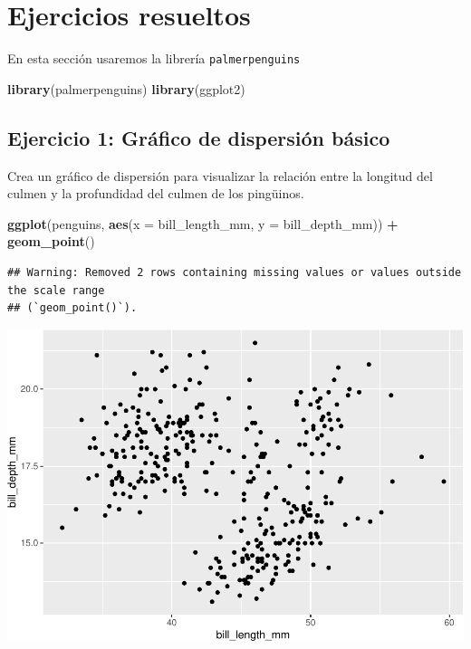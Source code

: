 \documentclass[
]{book}
\newenvironment{Shaded}{\begin{snugshade}}{\end{snugshade}}
\newcommand{\AttributeTok}[1]{\textcolor[rgb]{0.13,0.29,0.53}{#1}}
\newcommand{\FunctionTok}[1]{\textcolor[rgb]{0.13,0.29,0.53}{\textbf{#1}}}
\newcommand{\NormalTok}[1]{#1}
\newcommand{\SpecialCharTok}[1]{\textcolor[rgb]{0.81,0.36,0.00}{\textbf{#1}}}
\begin{document}
\hypertarget{ejercicios-resueltos}{%
\section{Ejercicios resueltos}\label{ejercicios-resueltos}}

En esta sección usaremos la librería \texttt{palmerpenguins}

\begin{Shaded}
\begin{Highlighting}[]
\FunctionTok{library}\NormalTok{(palmerpenguins)}
\FunctionTok{library}\NormalTok{(ggplot2)}
\end{Highlighting}
\end{Shaded}

\hypertarget{ejercicio-1-gruxe1fico-de-dispersiuxf3n-buxe1sico}{%
\subsection{Ejercicio 1: Gráfico de dispersión básico}\label{ejercicio-1-gruxe1fico-de-dispersiuxf3n-buxe1sico}}

Crea un gráfico de dispersión para visualizar la relación entre la longitud del culmen y la profundidad del culmen de los pingüinos.

\begin{Shaded}
\begin{Highlighting}[]
\FunctionTok{ggplot}\NormalTok{(penguins, }\FunctionTok{aes}\NormalTok{(}\AttributeTok{x =}\NormalTok{ bill\_length\_mm, }\AttributeTok{y =}\NormalTok{ bill\_depth\_mm)) }\SpecialCharTok{+}
  \FunctionTok{geom\_point}\NormalTok{()}
\end{Highlighting}
\end{Shaded}

\begin{verbatim}
## Warning: Removed 2 rows containing missing values or values outside the scale range
## (`geom_point()`).
\end{verbatim}

\includegraphics{bookdown-demo_files/figure-latex/unnamed-chunk-177-1.pdf}
\end{document}
